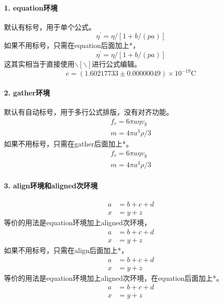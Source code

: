 \documentclass[10pt,a4paper,twocolumn,twoside,UTF8]{ctexart}
\begin{document}
	\paragraph*{1. equation环境}默认有标号，用于单个公式。
		\begin{equation}
		\eta^{\prime}=\eta /[1+b /(p a)]
		\end{equation}
		如果不用标号，只需在equation后面加上*，
		\begin{equation}
			\eta^{\prime}=\eta /[1+b /(p a)]
		\end{equation}
		这其实相当于直接使用$\backslash[\backslash]$进行公式编辑。
		\[e=(1.60217733 \pm 0.00000049) \times 10^{-19} \mathrm{C}\]

	\paragraph*{2. gather环境}默认有自动标号，用于多行公式排版，没有对齐功能。
		\begin{gather}
		f_r=6\pi a \eta v_g   \\
		m=4 \pi a^{3} \rho / 3
		\end{gather}
		如果不用标号，只需在gather后面加上*。
		\begin{gather*}
			f_r=6\pi a \eta v_g   \\
			m=4 \pi a^{3} \rho / 3
		\end{gather*}

	\paragraph*{3. align环境和aligned次环境}
		\begin{align}
		a &= b+c+d \\
		x &= y+z
		\end{align}
		等价的用法是equation环境加上aligned次环境，
		\begin{equation}
			\begin{aligned}
			a &= b+c+d \\
			x &= y+z
			\end{aligned}
		\end{equation}
		如果不用标号，只需在align后面加上*，
		\begin{align*}
			a &= b+c+d \\
			x &= y+z
		\end{align*}
		等价的用法是equation环境加上aligned次环境，在equation后面加上*。
		\begin{equation}
			\begin{aligned}
			a &= b+c+d \\
			x &= y+z
			\end{aligned}
		\end{equation}
\end{document}
